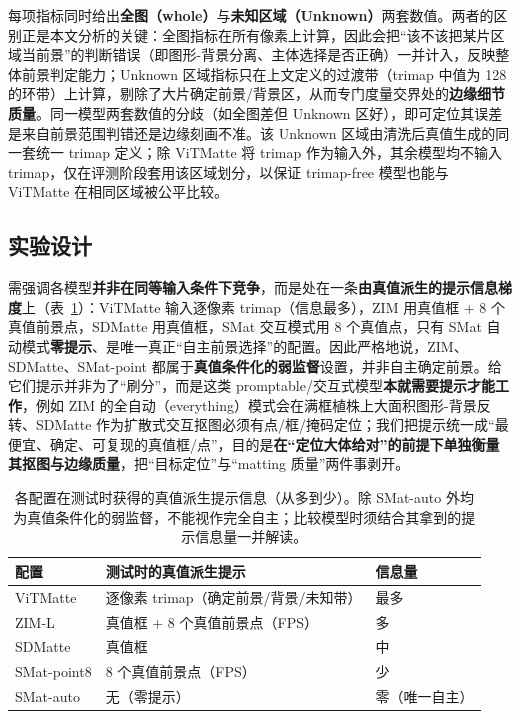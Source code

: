 \documentclass[supercite]{HustGraduPaper}
\begin{document}
	每项指标同时给出\textbf{全图（whole）}与\textbf{未知区域（Unknown）}两套数值。两者的区别正是本文分析的关键：全图指标在所有像素上计算，因此会把“该不该把某片区域当前景”的判断错误（即图形-背景分离、主体选择是否正确）一并计入，反映整体前景判定能力；Unknown 区域指标只在上文定义的过渡带（trimap 中值为 128 的环带）上计算，剔除了大片确定前景/背景区，从而专门度量交界处的\textbf{边缘细节质量}。同一模型两套数值的分歧（如全图差但 Unknown 区好），即可定位其误差是来自前景范围判错还是边缘刻画不准。该 Unknown 区域由清洗后真值生成的同一套统一 trimap 定义；除 ViTMatte 将 trimap 作为输入外，其余模型均不输入 trimap，仅在评测阶段套用该区域划分，以保证 trimap-free 模型也能与 ViTMatte 在相同区域被公平比较。

	\subsection{实验设计}
	需强调各模型\textbf{并非在同等输入条件下竞争}，而是处在一条\textbf{由真值派生的提示信息梯度}上（表~\ref{tab:cueinfo}）：ViTMatte 输入逐像素 trimap（信息最多），ZIM 用真值框 + 8 个真值前景点，SDMatte 用真值框，SMat 交互模式用 8 个真值点，只有 SMat 自动模式\textbf{零提示}、是唯一真正“自主前景选择”的配置。因此严格地说，ZIM、SDMatte、SMat-point 都属于\textbf{真值条件化的弱监督}设置，并非自主确定前景。给它们提示并非为了“刷分”，而是这类 promptable/交互式模型\textbf{本就需要提示才能工作}，例如 ZIM 的全自动（everything）模式会在满框植株上大面积图形-背景反转、SDMatte 作为扩散式交互抠图必须有点/框/掩码定位；我们把提示统一成“最便宜、确定、可复现的真值框/点”，目的是\textbf{在“定位大体给对”的前提下单独衡量其抠图与边缘质量}，把“目标定位”与“matting 质量”两件事剥开。

	\begin{table}[ht]
		\centering
		\caption{各配置在测试时获得的真值派生提示信息（从多到少）。除 SMat-auto 外均为真值条件化的弱监督，不能视作完全自主；比较模型时须结合其拿到的提示信息量一并解读。}
		\label{tab:cueinfo}
		\small
		\begin{tabular}{lll}
			\toprule
			配置 & 测试时的真值派生提示 & 信息量 \\
			\midrule
			ViTMatte    & 逐像素 trimap（确定前景/背景/未知带） & 最多 \\
			ZIM-L       & 真值框 + 8 个真值前景点（FPS）        & 多 \\
			SDMatte     & 真值框                                & 中 \\
			SMat-point8 & 8 个真值前景点（FPS）                 & 少 \\
			SMat-auto   & 无（零提示）                          & 零（唯一自主） \\
			\bottomrule
		\end{tabular}
	\end{table}
\end{document}
